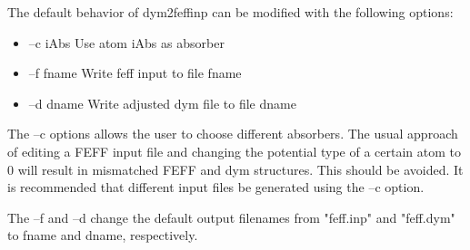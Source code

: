 \documentclass[11pt,oneside]{report} %
\begin{document}
The default behavior of dym2feffinp can be modified with the following options:
\begin{itemize}
\tightlist
 \item  --c  iAbs   Use atom iAbs as absorber
  \item --f  fname  Write feff input to file fname
 \item  --d  dname  Write adjusted dym file to file dname
\end{itemize}
The --c options allows the user to choose different absorbers. The usual
approach of editing a FEFF input file and changing the potential type of a
certain atom to 0 will result in mismatched FEFF and dym structures. This should
be avoided. It is recommended that different input files be generated using the
--c option.

The --f and --d change the default output filenames from "feff.inp" and
"feff.dym" to fname and dname, respectively.
\end{document}
